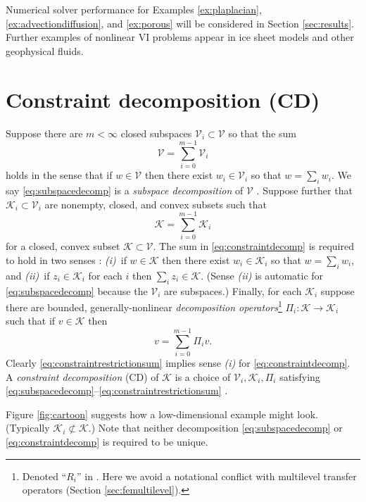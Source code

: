\documentclass[letterpaper,final,12pt,reqno]{amsart}
\theoremstyle{cstyle}
\theoremstyle{cstyle*}
\theoremstyle{dstyle}
\numberwithin{equation}{section}
\numberwithin{figure}{section}
\numberwithin{table}{section}
\numberwithin{theorem}{section}
\newcommand{\cK}{\mathcal{K}}
\newcommand{\cV}{\mathcal{V}}
\begin{document}
Numerical solver performance for Examples \ref{ex:plaplacian}, \ref{ex:advectiondiffusion}, and \ref{ex:porous} will be considered in Section \ref{sec:results}.  Further examples of nonlinear VI problems appear in ice sheet models \cite{Calvoetal2002,JouvetBueler2012} and other geophysical fluids.


\section{Constraint decomposition (CD)} \label{sec:cd}

Suppose there are $m<\infty$ closed subspaces $\cV_i \subset \cV$ so that the sum
\begin{equation}
\cV = \sum_{i=0}^{m-1} \cV_i \label{eq:subspacedecomp}
\end{equation}
holds in the sense that if $w \in \cV$ then there exist $w_i \in \cV_i$ so that $w = \sum_i w_i$.  We say \eqref{eq:subspacedecomp} is a \emph{subspace decomposition} of $\cV$ \cite{Xu1992}.  Suppose further that $\cK_i \subset \cV_i$ are nonempty, closed, and convex subsets such that
\begin{equation}
\cK = \sum_{i=0}^{m-1} \cK_i \label{eq:constraintdecomp}
\end{equation}
for a closed, convex subset $\cK \subset \cV$.  The sum in \eqref{eq:constraintdecomp} is required to hold in two senses \cite{TaiTseng2002}: \emph{(i)}~if $w \in \cK$ then there exist $w_i \in \cK_i$ so that $w = \sum_i w_i$, and \emph{(ii)}~if $z_i \in \cK_i$ for each $i$ then $\sum_i z_i \in \cK$.  (Sense \emph{(ii)} is automatic for \eqref{eq:subspacedecomp} because the $\cV_i$ are subspaces.)  Finally, for each $\cK_i$ suppose there are bounded, generally-nonlinear \emph{decomposition operators}\footnote{Denoted ``$R_i$'' in \cite{Tai2003}.  Here we avoid a notational conflict with multilevel transfer operators (Section \ref{sec:femultilevel}).} $\Pi_i : \cK \to \cK_i$ such that if $v \in \cK$ then
\begin{equation}
v = \sum_{i=0}^{m-1} \Pi_i v.  \label{eq:constraintrestrictionsum}
\end{equation}
Clearly \eqref{eq:constraintrestrictionsum} implies sense \emph{(i)} for \eqref{eq:constraintdecomp}. A \emph{constraint decomposition} (CD) of $\cK$ is a choice of $\cV_i,\cK_i,\Pi_i$ satisfying \eqref{eq:subspacedecomp}--\eqref{eq:constraintrestrictionsum} \cite{Tai2003}.

Figure \ref{fig:cartoon} suggests how a low-dimensional example might look.  (Typically $\cK_i \not\subset \cK$.)  Note that neither decomposition \eqref{eq:subspacedecomp} or \eqref{eq:constraintdecomp} is required to be unique.
\end{document}

